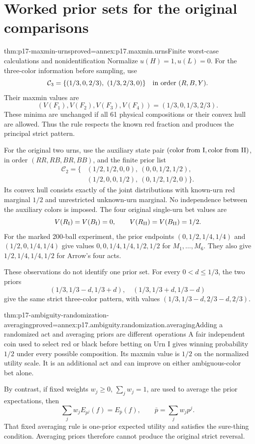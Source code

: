 \section{Worked prior sets for the original comparisons}

\begin{hbtheorem}{thm:p17-maxmin-urns}{proved=annex:p17.maxmin.urns}{Finite worst-case calculations and nonidentification}
Normalize \(u(H)=1,u(L)=0\).
For the three-color information before sampling, use
\[
       \mathcal C_3=
           \{(1/3,0,2/3),\ (1/3,2/3,0)\}
                      \quad\hbox{in order }(R,B,Y).
\]
Their maxmin values are
\[
          (V(F_1),V(F_2),V(F_3),V(F_4))=(1/3,0,1/3,2/3).
\]
These minima are unchanged if all 61 physical compositions
or their convex hull are allowed. Thus the rule respects
the known red fraction and produces the principal strict pattern.

For the original two urns, use the auxiliary state pair
\((\hbox{color from I},\hbox{color from II})\), in order
\((RR,RB,BR,BB)\), and the finite prior list
\[
\begin{split}
 \mathcal C_2=\{&
 (1/2,1/2,0,0),\ (0,0,1/2,1/2),\\
 &(1/2,0,0,1/2),\ (0,1/2,1/2,0)\}.
\end{split}
\]
Its convex hull consists exactly of the joint distributions
with known-urn red marginal \(1/2\) and unrestricted
unknown-urn marginal. No independence between the auxiliary
colors is imposed. The four original single-urn bet values are
\[
          V(R_{\rm I})=V(B_{\rm I})=0,\qquad
          V(R_{\rm II})=V(B_{\rm II})=1/2 .
\]
For the marked 200-ball experiment, the prior endpoints
\((0,1/2,1/4,1/4)\) and \((1/2,0,1/4,1/4)\)
give values \(0,0,1/4,1/4,1/2,1/2\) for \(M_1,\ldots,M_6\).
They also give \(1/2,1/4,1/4,1/2\) for Arrow's four acts.

These observations do not identify one prior set.
For every \(0<d\leq1/3\), the two priors
\[
       (1/3,1/3-d,1/3+d),\quad
       (1/3,1/3+d,1/3-d)
\]
give the same strict three-color pattern, with values
\((1/3,1/3-d,2/3-d,2/3)\).
\end{hbtheorem}

\begin{hbtheorem}{thm:p17-ambiguity-randomization-averaging}{proved=annex:p17.ambiguity.randomization.averaging}{Adding a randomized act and averaging priors are different operations}
A fair independent coin used to select red or black before
betting on Urn I gives winning probability \(1/2\) under
every possible composition. Its maxmin value is \(1/2\)
on the normalized utility scale. It is an additional act
and can improve on either ambiguous-color bet alone.

By contrast, if fixed weights \(w_j\geq0\), \(\sum_jw_j=1\),
are used to average the prior expectations, then
\[
                \sum_jw_jE_{p^j}(f)=E_{\bar p}(f),
                           \qquad\bar p=\sum_jw_jp^j.
\]
That fixed averaging rule is one-prior expected utility
and satisfies the sure-thing condition. Averaging priors
therefore cannot produce the original strict reversal.
\end{hbtheorem}


